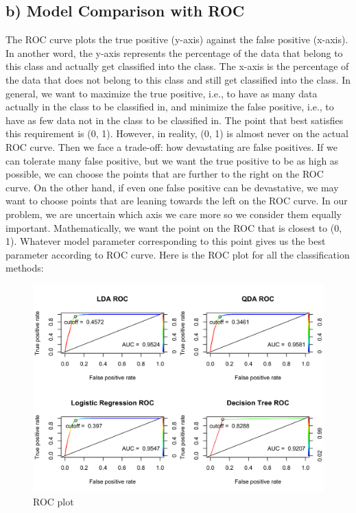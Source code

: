 \documentclass[jou]{apa}%
\begin{document}
\subsection{b) Model Comparison with ROC}
The ROC curve plots the true positive (y-axis) against the false positive (x-axis). In another word, the y-axis represents the percentage of the data that belong to this class and actually get classified into the class. The x-axis is the percentage of the data that does not belong to this class and still get classified into the class. In general, we want to maximize the true positive, i.e., to have as many data actually in the class to be classified in, and minimize the false positive, i.e., to have as few data not in the class to be classified in. The point that best satisfies this requirement is (0, 1). However, in reality, (0, 1) is almost never on the actual ROC curve. Then we face a trade-off: how devastating are false positives. If we can tolerate many false positive, but we want the true positive to be as high as possible, we can choose the points that are further to the right on the ROC curve. On the other hand, if even one false positive can be devastative, we may want to choose points that are leaning towards the left on the ROC curve. In our problem, we are uncertain which axis we care more so we consider them equally important. Mathematically, we want the point on the ROC that is closest to (0, 1). Whatever model parameter corresponding to this point gives us the best parameter according to ROC curve. Here is the ROC plot for all the classification methods:\\ 
\begin{figure}[H]\hspace*{-0.5cm} \centering\includegraphics[scale=0.2,]{ROC}\caption{ROC plot}\end{figure}
\end{document}

